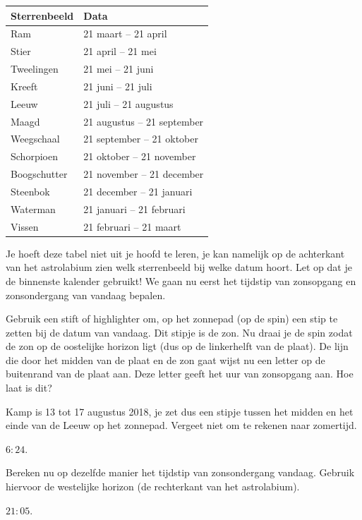 \begin{center}
\begin{tabular}{|l|l|}
 \hline
 Sterrenbeeld & Data \\
 \hline
 Ram & 21 maart -- 21 april \\
 Stier & 21 april -- 21 mei \\
 Tweelingen & 21 mei -- 21 juni \\
 Kreeft & 21 juni -- 21 juli \\
 Leeuw & 21 juli -- 21 augustus \\
 Maagd & 21 augustus -- 21 september \\
 Weegschaal & 21 september -- 21 oktober \\
 Schorpioen & 21 oktober -- 21 november \\
 Boogschutter & 21 november -- 21 december \\
 Steenbok & 21 december -- 21 januari \\
 Waterman & 21 januari -- 21 februari \\
 Vissen & 21 februari -- 21 maart \\
 \hline
\end{tabular}
\end{center}

Je hoeft deze tabel niet uit je hoofd te leren, je kan namelijk op de achterkant van het astrolabium zien welk sterrenbeeld bij welke datum hoort. Let op dat je de binnenste kalender gebruikt! We gaan nu eerst het tijdstip van zonsopgang en zonsondergang van vandaag bepalen. 
\begin{opgave}
 Gebruik een stift of highlighter om, op het zonnepad (op de spin) een stip te zetten bij de datum van vandaag. Dit stipje is de zon. Nu draai je de spin zodat de zon op de oostelijke horizon ligt (dus op de linkerhelft van de plaat). De lijn die door het midden van de plaat en de zon gaat wijst nu een letter op de buitenrand van de plaat aan. Deze letter geeft het uur van zonsopgang aan. Hoe laat is dit?
 \begin{hint}
  Kamp is 13 tot 17 augustus 2018, je zet dus een stipje tussen het midden en het einde van de Leeuw op het zonnepad. Vergeet niet om te rekenen naar zomertijd.
 \end{hint}
 \begin{antwoord}
  $6:24$.
 \end{antwoord}
\end{opgave}

\begin{opgave}
 Bereken nu op dezelfde manier het tijdstip van zonsondergang vandaag. Gebruik hiervoor de westelijke horizon (de rechterkant van het astrolabium). 
 \begin{antwoord}
  $21:05$.
 \end{antwoord}
\end{opgave}

